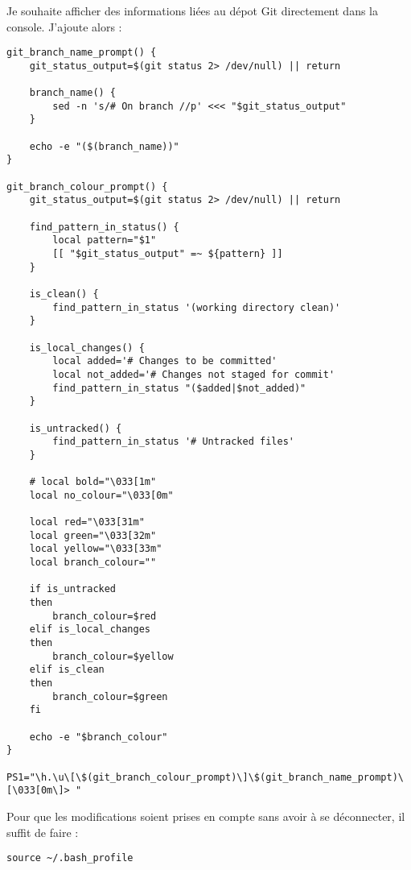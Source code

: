 Je souhaite afficher des informations liées au dépot Git directement dans la console. J'ajoute alors : 
\begin{footnotesize}
\begin{verbatim}
git_branch_name_prompt() {
    git_status_output=$(git status 2> /dev/null) || return

    branch_name() {
        sed -n 's/# On branch //p' <<< "$git_status_output"
    }

    echo -e "($(branch_name))"
}

git_branch_colour_prompt() {
    git_status_output=$(git status 2> /dev/null) || return

    find_pattern_in_status() {
        local pattern="$1"
        [[ "$git_status_output" =~ ${pattern} ]]
    }

    is_clean() {
        find_pattern_in_status '(working directory clean)'
    }

    is_local_changes() {
        local added='# Changes to be committed'
        local not_added='# Changes not staged for commit'
        find_pattern_in_status "($added|$not_added)"
    }

    is_untracked() {
        find_pattern_in_status '# Untracked files'
    }

    # local bold="\033[1m"
    local no_colour="\033[0m"

    local red="\033[31m"
    local green="\033[32m"
    local yellow="\033[33m"
    local branch_colour=""

    if is_untracked
    then
        branch_colour=$red
    elif is_local_changes
    then
        branch_colour=$yellow
    elif is_clean
    then
        branch_colour=$green
    fi

    echo -e "$branch_colour"
}

PS1="\h.\u\[\$(git_branch_colour_prompt)\]\$(git_branch_name_prompt)\[\033[0m\]> "
\end{verbatim}
\end{footnotesize}

Pour que les modifications soient prises en compte sans avoir à se déconnecter, il suffit de faire :
\begin{verbatim}
source ~/.bash_profile
\end{verbatim}


